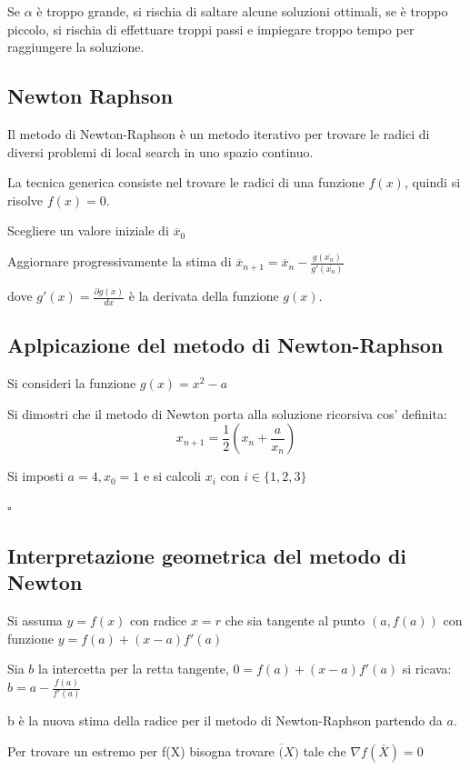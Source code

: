 \documentclass[12pt, a4paper]{article}
\begin{document}
Se $\alpha$ è troppo grande, si rischia di saltare alcune soluzioni ottimali, se è troppo piccolo, si rischia di effettuare troppi passi e impiegare troppo tempo per raggiungere la soluzione.

\subsection{Newton Raphson}

Il metodo di Newton-Raphson è un metodo iterativo per trovare le radici di diversi problemi di local search in uno spazio continuo.

La tecnica generica consiste nel trovare le radici di una funzione $f(x)$, quindi si risolve $f(x) = 0$.

Scegliere un valore iniziale di $\overline{x}_0$

Aggiornare progressivamente la stima di $\overline{x}_{n+1}=\overline{x}_n-\frac{g(\overline{x_n})}{g'(\overline{x_n})}$

dove $g'(x)=\frac{\partial g(x)}{dx}$ è la derivata della funzione $g(x)$.

\subsection*{Aplpicazione del metodo di Newton-Raphson}

Si consideri la funzione $g(x)=x^2-a$

Si dimostri che il metodo di Newton porta alla soluzione ricorsiva cos' definita:
$$
  x_{n+1}=\frac{1}{2}
  \left ( 
    x_n + \frac{a}{x_n}  
  \right )
$$
  
Si imposti $a=4, x_0=1$ e si calcoli $x_i$ con $i\in\{1,2,3\}$

$\square$

\subsection{Interpretazione geometrica del metodo di Newton}

Si assuma $y=f(x)$ con radice $x=r$ che sia tangente al punto $(a,f(a))$ con funzione $y=f(a)+(x-a)f'(a)$

Sia $b$ la intercetta per la retta tangente, $0=f(a)+(x-a)f'(a)$ si ricava: $b=a-\frac{f(a)}{f'(a)}$

b è la nuova stima della radice per il metodo di Newton-Raphson partendo da $a$.

Per trovare un estremo per f(X) bisogna trovare $\overline(X)$ tale che $\nabla f(\overline{X})=0$
\end{document}
